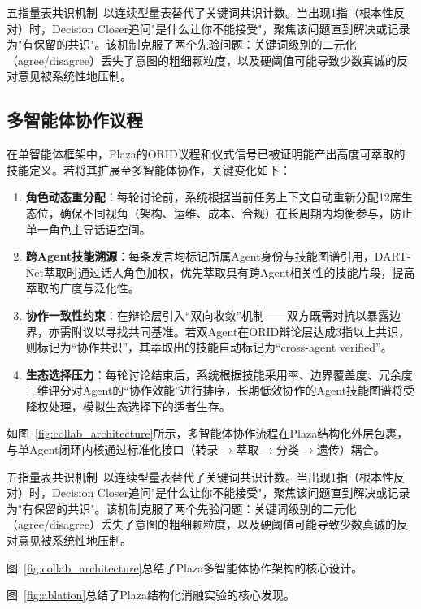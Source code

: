 \documentclass[12pt,a4paper]{ctexart}
\begin{document}
五指量表共识机制~\cite{lippincott2025fuzzy}以连续型量表替代了关键词共识计数。当出现1指（根本性反对）时，Decision Closer追问"是什么让你不能接受"，聚焦该问题直到解决或记录为"有保留的共识"。该机制克服了两个先验问题：关键词级别的二元化（agree/disagree）丢失了意图的粗细颗粒度，以及硬阈值可能导致少数真诚的反对意见被系统性地压制。

\subsection{多智能体协作议程}

在单智能体框架中，Plaza的ORID议程和仪式信号已被证明能产出高度可萃取的技能定义。若将其扩展至多智能体协作，关键变化如下：

\begin{enumerate}
  \item \textbf{角色动态重分配}：每轮讨论前，系统根据当前任务上下文自动重新分配12席生态位，确保不同视角（架构、运维、成本、合规）在长周期内均衡参与，防止单一角色主导话语空间。
  \item \textbf{跨Agent技能溯源}：每条发言均标记所属Agent身份与技能图谱引用，DART-Net萃取时通过话人角色加权，优先萃取具有跨Agent相关性的技能片段，提高萃取的广度与泛化性。
  \item \textbf{协作一致性约束}：在辩论层引入“双向收敛”机制——双方既需对抗以暴露边界，亦需附议以寻找共同基准。若双Agent在ORID辩论层达成3指以上共识，则标记为“协作共识”，其萃取出的技能自动标记为“cross-agent verified”。
  \item \textbf{生态选择压力}：每轮讨论结束后，系统根据技能采用率、边界覆盖度、冗余度三维评分对Agent的“协作效能”进行排序，长期低效协作的Agent技能图谱将受降权处理，模拟生态选择下的适者生存。
\end{enumerate}

如图~\ref{fig:collab_architecture}所示，多智能体协作流程在Plaza结构化外层包裹，与单Agent闭环内核通过标准化接口（转录$\to$萃取$\to$分类$\to$遗传）耦合。

五指量表共识机制~\cite{lippincott2025fuzzy}以连续型量表替代了关键词共识计数。当出现1指（根本性反对）时，Decision Closer追问"是什么让你不能接受"，聚焦该问题直到解决或记录为"有保留的共识"。该机制克服了两个先验问题：关键词级别的二元化（agree/disagree）丢失了意图的粗细颗粒度，以及硬阈值可能导致少数真诚的反对意见被系统性地压制。

图~\ref{fig:collab_architecture}总结了Plaza多智能体协作架构的核心设计。

图~\ref{fig:ablation}总结了Plaza结构化消融实验的核心发现。
\end{document}
